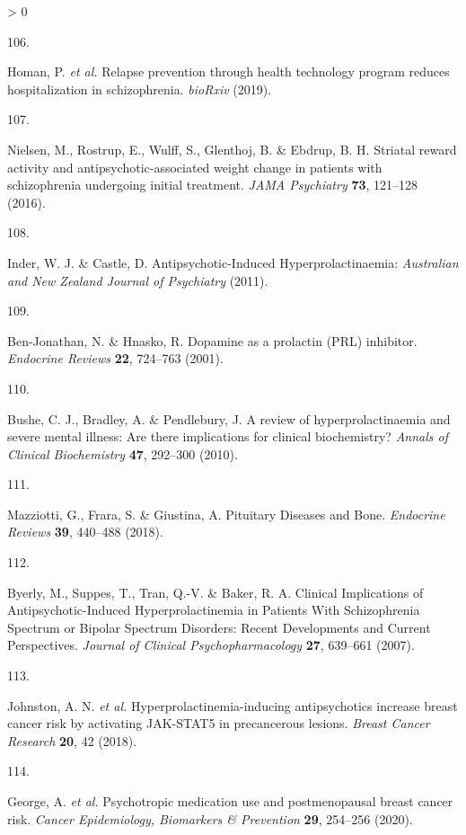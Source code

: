 \documentclass[
  9pt,
  english,
  ,jou,floatsintext]{apa6}
\newlength{\cslhangindent}
\newlength{\csllabelwidth}
\newenvironment{CSLReferences}[2] %
 {%
  \setlength{\parindent}{0pt}
  \ifodd #1 \everypar{\setlength{\hangindent}{\cslhangindent}}\ignorespaces\fi
  \ifnum #2 > 0
  \setlength{\parskip}{#2\baselineskip}
  \fi
 }%
 {}
\newcommand{\CSLLeftMargin}[1]{\parbox[t]{\csllabelwidth}{#1}}
\newcommand{\CSLRightInline}[1]{\parbox[t]{\linewidth - \csllabelwidth}{#1}\break}
\begin{document}
\begin{CSLReferences}{0}{0}
\leavevmode\hypertarget{ref-Homan2019h}{}%
\CSLLeftMargin{106. }
\CSLRightInline{Homan, P. \emph{et al.} Relapse prevention through health technology program reduces hospitalization in schizophrenia. \emph{bioRxiv} (2019).}

\leavevmode\hypertarget{ref-Nielsen2016}{}%
\CSLLeftMargin{107. }
\CSLRightInline{Nielsen, M., Rostrup, E., Wulff, S., Glenthoj, B. \& Ebdrup, B. H. Striatal reward activity and antipsychotic-associated weight change in patients with schizophrenia undergoing initial treatment. \emph{JAMA Psychiatry} \textbf{73}, 121--128 (2016).}

\leavevmode\hypertarget{ref-Inder2011}{}%
\CSLLeftMargin{108. }
\CSLRightInline{Inder, W. J. \& Castle, D. Antipsychotic-{Induced} {Hyperprolactinaemia}: \emph{Australian and New Zealand Journal of Psychiatry} (2011).}

\leavevmode\hypertarget{ref-BenJonathan2001}{}%
\CSLLeftMargin{109. }
\CSLRightInline{Ben-Jonathan, N. \& Hnasko, R. Dopamine as a prolactin ({PRL}) inhibitor. \emph{Endocrine Reviews} \textbf{22}, 724--763 (2001).}

\leavevmode\hypertarget{ref-Bushe2010}{}%
\CSLLeftMargin{110. }
\CSLRightInline{Bushe, C. J., Bradley, A. \& Pendlebury, J. A review of hyperprolactinaemia and severe mental illness: {Are} there implications for clinical biochemistry? \emph{Annals of Clinical Biochemistry} \textbf{47}, 292--300 (2010).}

\leavevmode\hypertarget{ref-Mazziotti2018}{}%
\CSLLeftMargin{111. }
\CSLRightInline{Mazziotti, G., Frara, S. \& Giustina, A. Pituitary {Diseases} and {Bone}. \emph{Endocrine Reviews} \textbf{39}, 440--488 (2018).}

\leavevmode\hypertarget{ref-Byerly2007}{}%
\CSLLeftMargin{112. }
\CSLRightInline{Byerly, M., Suppes, T., Tran, Q.-V. \& Baker, R. A. Clinical {Implications} of {Antipsychotic}-{Induced} {Hyperprolactinemia} in {Patients} {With} {Schizophrenia} {Spectrum} or {Bipolar} {Spectrum} {Disorders}: {Recent} {Developments} and {Current} {Perspectives}. \emph{Journal of Clinical Psychopharmacology} \textbf{27}, 639--661 (2007).}

\leavevmode\hypertarget{ref-Johnston2018}{}%
\CSLLeftMargin{113. }
\CSLRightInline{Johnston, A. N. \emph{et al.} Hyperprolactinemia-inducing antipsychotics increase breast cancer risk by activating {JAK}-{STAT5} in precancerous lesions. \emph{Breast Cancer Research} \textbf{20}, 42 (2018).}

\leavevmode\hypertarget{ref-George2020}{}%
\CSLLeftMargin{114. }
\CSLRightInline{George, A. \emph{et al.} Psychotropic medication use and postmenopausal breast cancer risk. \emph{{Cancer Epidemiology, Biomarkers \& Prevention}} \textbf{29}, 254--256 (2020).}


\end{CSLReferences}
\end{document}
